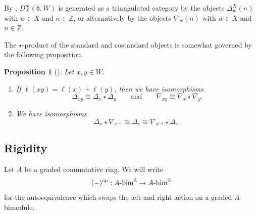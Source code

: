 \documentclass{amsart}
\newcommand{\Z}{\mathbb{Z}}
\newcommand{\grbim}[1]{#1\textnormal{-bim}^{\Z}}
\newcommand{\BE}{D^m}
\newcommand{\fr}[1]{\mathfrak{#1}}
\DeclareMathOperator{\op}{op}
\newtheorem{proposition}{Proposition}[section]
\theoremstyle{definition}
\begin{document}
        By \cite[Lemma 6.9]{ARV}, $\BE_X (\fr{h}, W)$ is generated as a triangulated category by the objects $\Delta_w^X (n)$ with $w \in X$ and $n \in \Z$, or alternatively by the objects $\nabla_w (n)$ with $w \in X$ and $n \in \Z$.

        The $\star$-product of the standard and costandard objects is somewhat governed by the following proposition.
        \begin{proposition}[\!]\label{prop:arv_convolution}
                Let $x,y \in W$.
                \begin{enumerate}
                        \item If $\ell (xy) = \ell (x) + \ell (y)$, then we have isomorphisms
                        \[\Delta_{xy} \cong \Delta_x \star \Delta_y \qquad\text{and}\qquad \nabla_{xy} \cong \nabla_x \star \nabla_y.\]
                        \item We have isomorphisms 
                        \[\Delta_x \star \nabla_{x^{-1}} \cong \Delta_e \cong \nabla_{x^{-1}} \star \Delta_x.\]
                \end{enumerate}
        \end{proposition}

        \subsection{Rigidity}

        Let $A$ be a graded commutative ring. We will write
        \[(-)^{\op} : \grbim{A} \to \grbim{A}\]
        for the autoequivalence which swaps the left and right action on a graded $A$-bimodule.
\end{document}
